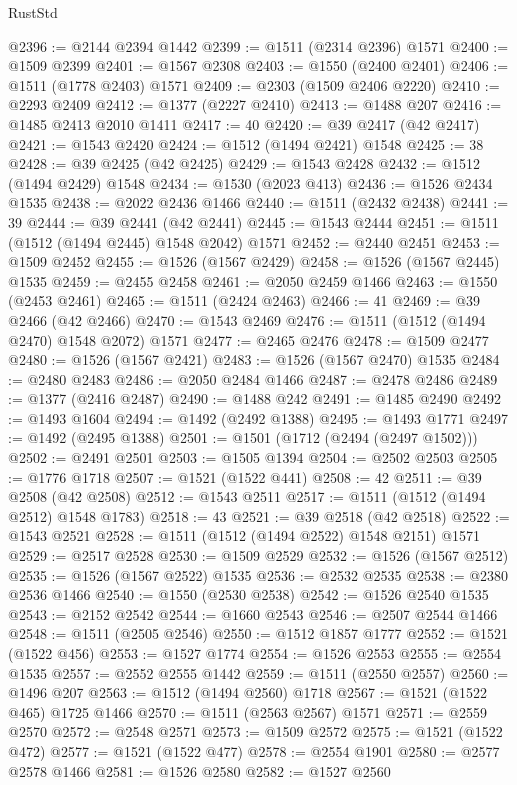 \begin{lexlean}{RustStd}
\begin{coremodule}
{{@2396 := @2144 @2394 @1442
@2399 := @1511 (@2314 @2396) @1571
@2400 := @1509 @2399
@2401 := @1567 @2308
@2403 := @1550 (@2400 @2401)
@2406 := @1511 (@1778 @2403) @1571
@2409 := @2303 (@1509 @2406 @2220)
@2410 := @2293 @2409
@2412 := @1377 (@2227 @2410)
@2413 := @1488 @207
@2416 := @1485 @2413 @2010 @1411
@2417 := 40
@2420 := @39 @2417 (@42 @2417)
@2421 := @1543 @2420
@2424 := @1512 (@1494 @2421) @1548
@2425 := 38
@2428 := @39 @2425 (@42 @2425)
@2429 := @1543 @2428
@2432 := @1512 (@1494 @2429) @1548
@2434 := @1530 (@2023 @413)
@2436 := @1526 @2434 @1535
@2438 := @2022 @2436 @1466
@2440 := @1511 (@2432 @2438)
@2441 := 39
@2444 := @39 @2441 (@42 @2441)
@2445 := @1543 @2444
@2451 := @1511 (@1512 (@1494 @2445) @1548 @2042) @1571
@2452 := @2440 @2451
@2453 := @1509 @2452
@2455 := @1526 (@1567 @2429)
@2458 := @1526 (@1567 @2445) @1535
@2459 := @2455 @2458
@2461 := @2050 @2459 @1466
@2463 := @1550 (@2453 @2461)
@2465 := @1511 (@2424 @2463)
@2466 := 41
@2469 := @39 @2466 (@42 @2466)
@2470 := @1543 @2469
@2476 := @1511 (@1512 (@1494 @2470) @1548 @2072) @1571
@2477 := @2465 @2476
@2478 := @1509 @2477
@2480 := @1526 (@1567 @2421)
@2483 := @1526 (@1567 @2470) @1535
@2484 := @2480 @2483
@2486 := @2050 @2484 @1466
@2487 := @2478 @2486
@2489 := @1377 (@2416 @2487)
@2490 := @1488 @242
@2491 := @1485 @2490
@2492 := @1493 @1604
@2494 := @1492 (@2492 @1388)
@2495 := @1493 @1771
@2497 := @1492 (@2495 @1388)
@2501 := @1501 (@1712 (@2494 (@2497 @1502)))
@2502 := @2491 @2501
@2503 := @1505 @1394
@2504 := @2502 @2503
@2505 := @1776 @1718
@2507 := @1521 (@1522 @441)
@2508 := 42
@2511 := @39 @2508 (@42 @2508)
@2512 := @1543 @2511
@2517 := @1511 (@1512 (@1494 @2512) @1548 @1783)
@2518 := 43
@2521 := @39 @2518 (@42 @2518)
@2522 := @1543 @2521
@2528 := @1511 (@1512 (@1494 @2522) @1548 @2151) @1571
@2529 := @2517 @2528
@2530 := @1509 @2529
@2532 := @1526 (@1567 @2512)
@2535 := @1526 (@1567 @2522) @1535
@2536 := @2532 @2535
@2538 := @2380 @2536 @1466
@2540 := @1550 (@2530 @2538)
@2542 := @1526 @2540 @1535
@2543 := @2152 @2542
@2544 := @1660 @2543
@2546 := @2507 @2544 @1466
@2548 := @1511 (@2505 @2546)
@2550 := @1512 @1857 @1777
@2552 := @1521 (@1522 @456)
@2553 := @1527 @1774
@2554 := @1526 @2553
@2555 := @2554 @1535
@2557 := @2552 @2555 @1442
@2559 := @1511 (@2550 @2557)
@2560 := @1496 @207
@2563 := @1512 (@1494 @2560) @1718
@2567 := @1521 (@1522 @465) @1725 @1466
@2570 := @1511 (@2563 @2567) @1571
@2571 := @2559 @2570
@2572 := @2548 @2571
@2573 := @1509 @2572
@2575 := @1521 (@1522 @472)
@2577 := @1521 (@1522 @477)
@2578 := @2554 @1901
@2580 := @2577 @2578 @1466
@2581 := @1526 @2580
@2582 := @1527 @2560
}}
\end{coremodule}
\end{lexlean}
